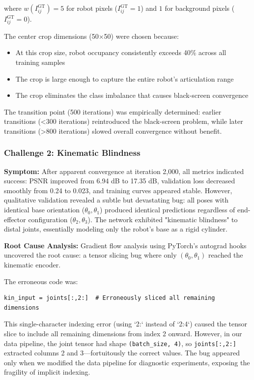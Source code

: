 \documentclass[12pt,a4paper,oneside]{report}
\begin{document}
where $w(I_{ij}^{\text{GT}}) = 5$ for robot pixels ($I_{ij}^{\text{GT}} = 1$) and $1$ for background pixels ($I_{ij}^{\text{GT}} = 0$).

The center crop dimensions (50×50) were chosen because:

\begin{itemize}
    \item At this crop size, robot occupancy consistently exceeds 40\% across all training samples
    \item The crop is large enough to capture the entire robot's articulation range
    \item The crop eliminates the class imbalance that causes black-screen convergence
\end{itemize}

The transition point (500 iterations) was empirically determined: earlier transitions (<300 iterations) reintroduced the black-screen problem, while later transitions (>800 iterations) slowed overall convergence without benefit.

\subsubsection{Challenge 2: Kinematic Blindness}
\label{subsubsec:challenge_2_kinematic_blindness}

\textbf{Symptom:} After apparent convergence at iteration 2,000, all metrics indicated success: PSNR improved from 6.94 dB to 17.35 dB, validation loss decreased smoothly from 0.24 to 0.023, and training curves appeared stable. However, qualitative validation revealed a subtle but devastating bug: all poses with identical base orientation ($\theta_0, \theta_1$) produced identical predictions regardless of end-effector configuration ($\theta_2, \theta_3$). The network exhibited "kinematic blindness" to distal joints, essentially modeling only the robot's base as a rigid cylinder.

\textbf{Root Cause Analysis:} Gradient flow analysis using PyTorch's autograd hooks uncovered the root cause: a tensor slicing bug where only $(\theta_0, \theta_1)$ reached the kinematic encoder.

The erroneous code was:
\begin{verbatim}
kin_input = joints[:,2:]  # Erroneously sliced all remaining dimensions
\end{verbatim}

This single-character indexing error (using `2:` instead of `2:4`) caused the tensor slice to include all remaining dimensions from index 2 onward. However, in our data pipeline, the joint tensor had shape \texttt{(batch\_size, 4)}, so \texttt{joints[:,2:]} extracted columns 2 and 3---fortuitously the correct values. The bug appeared only when we modified the data pipeline for diagnostic experiments, exposing the fragility of implicit indexing.
\end{document}
